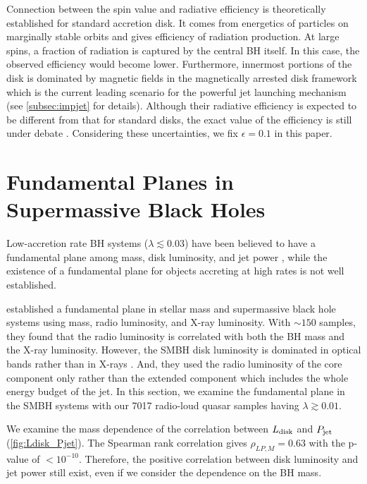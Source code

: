 \documentclass[preprint2,twocolappendix]{aastex6}
\begin{document}
Connection between the spin value and radiative efficiency is theoretically established for standard accretion disk. It comes from energetics of particles on marginally stable orbits and gives efficiency of radiation production. At large spins, a fraction of radiation is captured by the central BH itself. In this case, the observed efficiency would become lower. Furthermore, innermost portions of the disk is dominated by magnetic fields in the magnetically arrested disk \citep[MAD;][]{nar03} framework which is the current leading scenario for the powerful jet launching mechanism (see \autoref{subsec:impjet} for details). Although their radiative efficiency is expected to be different from that for standard disks, the exact value of the efficiency is still under debate \citep[see e.g.,][]{pun14,pun15,pun16,ava16}. Considering these uncertainties, we fix $\epsilon=0.1$ in this paper.

\section{Fundamental Planes in Supermassive Black Holes}
\label{sec:plane}

Low-accretion rate BH systems ($\lambda\lesssim0.03$) have been believed to have a fundamental plane among mass, disk luminosity, and jet power \citep[e.g.][]{ter03, mer03,mac03,plo12}, while the existence of a fundamental plane for objects accreting at high rates is not well established. 

\citet{mer03} established a fundamental plane in stellar mass and supermassive black hole systems using mass, radio luminosity, and X-ray luminosity. With $\sim150$ samples, they found that the radio luminosity is correlated with both the BH mass and the X-ray luminosity. However, the SMBH disk luminosity is dominated in optical bands rather than in X-rays \citep{elv94}. And, they used the radio luminosity of the core component only rather than the extended component which includes the whole energy budget of the jet. In this section, we examine the fundamental plane in the SMBH systems with our 7017 radio-loud quasar samples having $\lambda\gtrsim0.01$.

We examine the mass dependence of the correlation between $L_{\rm disk}$ and $P_{\rm jet}$ (\autoref{fig:Ldisk_Pjet}). The Spearman rank correlation gives $\rho_{LP, M}=0.63$ with the p-value of $<10^{-10}$. Therefore, the positive correlation between disk luminosity and jet power still exist, even if we consider the dependence on the BH mass. 
\end{document}
